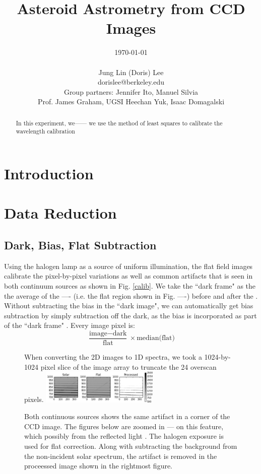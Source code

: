 \documentclass[authoryear, 12pt,5p, times]{elsarticle}
\begin{document}
\begin{frontmatter}
\title{Asteroid Astrometry from CCD Images}
\author{\today \\ \quad \\Jung Lin (Doris) Lee\\ dorislee@berkeley.edu\\Group partners: Jennifer Ito, Manuel Silvia\\Prof. James Graham, UGSI Heechan Yuk, Isaac Domagalski}
	\begin{abstract}
In this experiment,  we------
we use the method of least squares to calibrate the wavelength calibration 
	\end{abstract}
\end{frontmatter}
\section{Introduction}
\section{Data Reduction}
\subsection{Dark, Bias, Flat Subtraction}
Using the halogen lamp as a source of uniform illumination, the flat field images calibrate the pixel-by-pixel variations as well as common artifacts that is seen in both continuum sources as shown in Fig. \ref{calib}. We take the ``dark frame" as the the average of the ---- (i.e. the flat region shown in Fig. ----) before and after the  . Without subtracting the bias in the ``dark image", we can automatically get bias subtraction by simply subtraction off the dark, as the bias is incorporated as part of the ``dark frame" .
Every image pixel is:
\begin{equation}
			\frac{\text{image}-\text{dark}}{\text{flat}}\times\text{median(flat)}
			\label{calib_eq}
\end{equation}
 \begin{figure}[h!]
 When converting the 2D images to 1D spectra, we took a 1024-by-1024 pixel slice of the image array to truncate the 24 overscan pixels.
\includegraphics[width=0.5\textwidth]{figures/processed}
\caption{Both continuous sources shows the same artifact in a corner of the CCD image. The figures below are zoomed in --- on this feature, which  possibly from the reflected light . The halogen exposure is used for flat correction. Along with subtracting the background from the non-incident solar spectrum, the artifact is removed in the proceessed image shown in the rightmost figure.}
\label{processed}
\end{figure}
\end{document}

